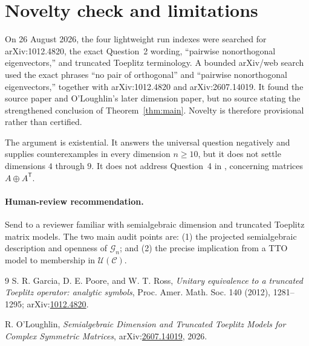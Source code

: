 \documentclass[11pt]{article}
\newcommand{\Ucal}{\mathcal{U}}
\newcommand{\Ccal}{\mathcal{C}}
\newcommand{\T}{^{\mathsf T}}
\begin{document}
\section{Novelty check and limitations}

On 26 August 2026, the four lightweight run indexes were searched for
arXiv:1012.4820, the exact Question~2 wording, ``pairwise nonorthogonal
eigenvectors,'' and truncated Toeplitz terminology.  A bounded arXiv/web
search used the exact phrases ``no pair of orthogonal'' and ``pairwise
nonorthogonal eigenvectors,'' together with arXiv:1012.4820 and
arXiv:2607.14019.  It found the source paper and O'Loughlin's later dimension
paper, but no source stating the strengthened conclusion of
Theorem~\ref{thm:main}.  Novelty is therefore provisional rather than
certified.

The argument is existential.  It answers the universal question negatively
and supplies counterexamples in every dimension $n\geq10$, but it does not
settle dimensions $4$ through $9$.  It does not address Question~4 in
\cite{GPR}, concerning matrices $A\oplus A\T$.

\paragraph{Human-review recommendation.}
Send to a reviewer familiar with semialgebraic dimension and truncated
Toeplitz matrix models.  The two main audit points are: (1) the projected
semialgebraic description and openness of $\mathcal G_n$; and (2) the precise
implication from a TTO model to membership in $\Ucal(\Ccal)$.

\begin{thebibliography}{9}
S. R. Garcia, D. E. Poore, and W. T. Ross,
\emph{Unitary equivalence to a truncated Toeplitz operator: analytic symbols},
Proc. Amer. Math. Soc. 140 (2012), 1281--1295;
arXiv:\href{https://arxiv.org/abs/1012.4820}{1012.4820}.

R. O'Loughlin,
\emph{Semialgebraic Dimension and Truncated Toeplitz Models for Complex
Symmetric Matrices},
arXiv:\href{https://arxiv.org/abs/2607.14019}{2607.14019}, 2026.
\end{thebibliography}
\end{document}
